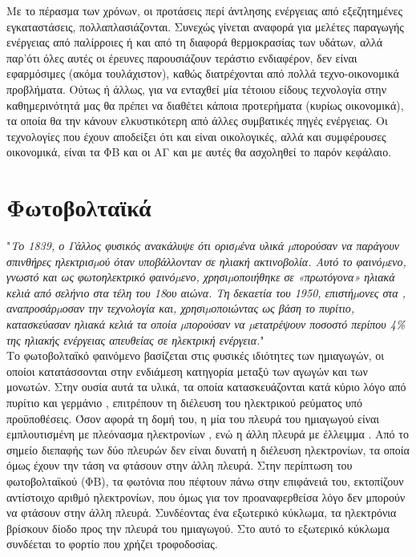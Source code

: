 \documentclass[12pt]{report}
\begin{document}
Με το πέρασμα των χρόνων, οι προτάσεις περί άντλησης ενέργειας από εξεζητημένες εγκαταστάσεις, πολλαπλασιάζονται. Συνεχώς γίνεται αναφορά για μελέτες παραγωγής ενέργειας από παλίρροιες ή και από τη διαφορά θερμοκρασίας των υδάτων, 
αλλά παρ'ότι όλες αυτές οι έρευνες παρουσιάζουν τεράστιο ενδιαφέρον, δεν είναι εφαρμόσιμες (ακόμα τουλάχιστον), καθώς διατρέχονται από πολλά τεχνο-οικονομικά προβλήματα. Ούτως ή άλλως, για να ενταχθεί μία τέτοιου είδους τεχνολογία 
στην καθημερινότητά μας θα πρέπει να διαθέτει κάποια προτερήματα (κυρίως οικονομικά), τα οποία θα την κάνουν ελκυστικότερη από άλλες συμβατικές πηγές ενέργειας. Οι τεχνολογίες που έχουν αποδείξει ότι και είναι οικολογικές, αλλά και 
συμφέρουσες οικονομικά, είναι τα ΦΒ και οι ΑΓ και με αυτές θα ασχοληθεί το παρόν κεφάλαιο. 
\section{Φωτοβολταϊκά}
"{\textit{Το 1839, ο Γάλλος φυσικός {} ανακάλυψε ότι ορισµένα υλικά µπορούσαν να παράγουν σπινθήρες ηλεκτρισµού όταν υποβάλλονταν σε ηλιακή ακτινοβολία. Αυτό το φαινόµενο, γνωστό και ως φωτοηλεκτρικό
φαινόµενο, χρησιµοποιήθηκε σε «πρωτόγονα» ηλιακά κελιά από σελήνιο στα τέλη του 18ου αιώνα. Τη δεκαετία του 1950, επιστήµονες στα {}, αναπροσάρµοσαν την τεχνολογία και, χρησιµοποιώντας ως βάση το
πυρίτιο, κατασκεύασαν ηλιακά κελιά τα οποία µπορούσαν να µετατρέψουν ποσοστό περίπου 4\% της ηλιακής ενέργειας απευθείας σε ηλεκτρική ενέργεια.}}" \parencite{teetkm2011}
\\[10pt]
Το φωτοβολταϊκό φαινόμενο βασίζεται στις φυσικές ιδιότητες των ημιαγωγών, οι οποίοι κατατάσσονται στην ενδιάμεση κατηγορία μεταξύ των αγωγών και των μονωτών. Στην ουσία αυτά τα υλικά, τα οποία κατασκευάζονται κατά κύριο λόγο
από πυρίτιο {} και γερμάνιο {}, επιτρέπουν τη διέλευση του ηλεκτρικού ρεύματος υπό προϋποθέσεις. Όσον αφορά τη δομή του, η μία του πλευρά του ημιαγωγού είναι εμπλουτισμένη με πλεόνασμα ηλεκτρονίων 
{}, ενώ η άλλη πλευρά με έλλειμμα {}. Από το σημείο διεπαφής {} των δύο πλευρών δεν είναι δυνατή η διέλευση ηλεκτρονίων, τα οποία όμως έχουν την τάση να φτάσουν στην άλλη πλευρά.
Στην περίπτωση του φωτοβολταϊκού (ΦΒ), τα φωτόνια που πέφτουν πάνω στην επιφάνειά του, εκτοπίζουν αντίστοιχο αριθμό ηλεκτρονίων, που όμως για τον προαναφερθείσα λόγο δεν μπορούν να φτάσουν στην άλλη πλευρά. Συνδέοντας ένα εξωτερικό 
κύκλωμα, τα ηλεκτρόνια βρίσκουν δίοδο προς την {} πλευρά του ημιαγωγού. Στο αυτό το εξωτερικό κύκλωμα συνδέεται το φορτίο που χρήζει τροφοδοσίας.
\end{document}
